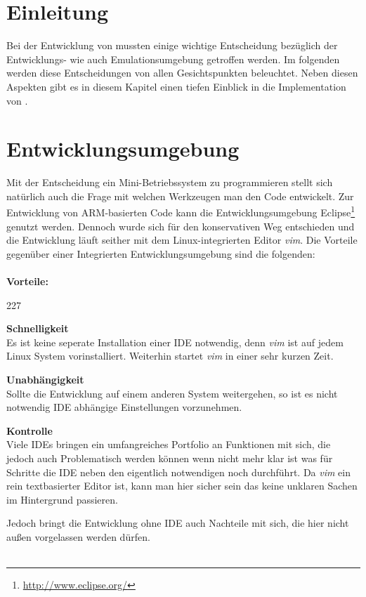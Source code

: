 \section{Einleitung}
Bei der Entwicklung von \mops mussten einige wichtige Entscheidung bez\"uglich der Entwicklungs- wie auch Emulationsumgebung getroffen werden. Im folgenden werden diese Entscheidungen von allen Gesichtspunkten beleuchtet. Neben diesen Aspekten gibt es in diesem Kapitel einen tiefen Einblick in die Implementation von \mops. 

\section{Entwicklungsumgebung}
Mit der Entscheidung ein Mini-Betriebssystem zu programmieren stellt sich nat\"urlich auch die Frage mit welchen Werkzeugen man den Code entwickelt. Zur Entwicklung von ARM-basierten Code kann die Entwicklungsumgebung Eclipse\footnote{\url{http://www.eclipse.org/}}  genutzt werden. Dennoch wurde sich f\"ur den konservativen Weg entschieden und die Entwicklung l\"auft seither mit dem Linux-integrierten Editor \textit{vim}. Die Vorteile gegen\"uber einer Integrierten Entwicklungsumgebung sind die folgenden: \\\\
\textbf{Vorteile:}
\begin{dinglist}{227}
	\item{\textbf{Schnelligkeit}}\\
	 Es ist keine seperate Installation einer IDE notwendig, denn \textit{vim} ist auf jedem Linux System vorinstalliert. Weiterhin startet \textit{vim} in einer sehr kurzen Zeit.
	\item{\textbf{Unabh\"angigkeit}}\\
	Sollte die Entwicklung auf einem anderen System weitergehen, so ist es nicht notwendig IDE abh\"angige Einstellungen vorzunehmen.
	\item{\textbf{Kontrolle}}\\
	Viele IDEs bringen ein umfangreiches Portfolio an Funktionen mit sich, die jedoch auch Problematisch werden k\"onnen wenn nicht mehr klar ist was f\"ur Schritte die IDE neben den eigentlich notwendigen noch durchf\"uhrt. Da \textit{vim} ein rein textbasierter Editor ist, kann man hier sicher sein das keine unklaren Sachen im Hintergrund passieren.
\end{dinglist}
Jedoch bringt die Entwicklung ohne IDE auch Nachteile mit sich, die hier nicht au\ss en vorgelassen werden d\"urfen.\\ \\
